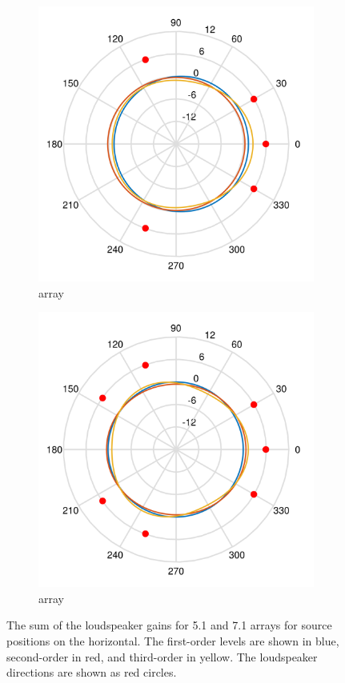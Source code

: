 \documentclass[12pt]{report}
\begin{document}
\begin{figure}[tbp]
  \centering
  \begin{subfigure}{0.45\textwidth}
    \includegraphics[width=\linewidth]{figures/gainSums_5p0.png}
    \caption{ array}
  \end{subfigure}
  \hfill
  \begin{subfigure}{0.45\textwidth}
    \includegraphics[width=\linewidth]{figures/gainSums_7p0.png}
    \caption{ array}
  \end{subfigure}
    \caption{The sum of the loudspeaker gains for 5.1 and 7.1 arrays for source positions on the horizontal.
    The first-order levels are shown in blue, second-order in red, and third-order in yellow.
    The loudspeaker directions are shown as red circles.}
  \label{fig:irregular_loudspeaker_levels}
\end{figure}
\end{document}
